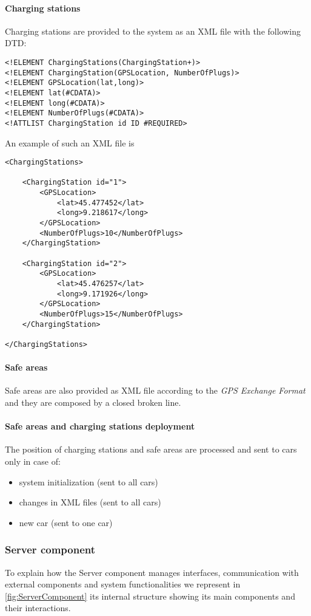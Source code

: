 \paragraph{Charging stations}Charging stations are provided to the system as an XML file with the following DTD:
\lstset{language=XML,frame=false}
\begin{lstlisting}
<!ELEMENT ChargingStations(ChargingStation+)>
<!ELEMENT ChargingStation(GPSLocation, NumberOfPlugs)>
<!ELEMENT GPSLocation(lat,long)>
<!ELEMENT lat(#CDATA)>
<!ELEMENT long(#CDATA)>
<!ELEMENT NumberOfPlugs(#CDATA)>
<!ATTLIST ChargingStation id ID #REQUIRED>
\end{lstlisting}
An example of such an XML file is 
\begin{lstlisting}
<ChargingStations>

	<ChargingStation id="1">
		<GPSLocation>
			<lat>45.477452</lat>
			<long>9.218617</long>
		</GPSLocation>
		<NumberOfPlugs>10</NumberOfPlugs>
	</ChargingStation>
	
	<ChargingStation id="2">
		<GPSLocation>
			<lat>45.476257</lat>
			<long>9.171926</long>
		</GPSLocation>
		<NumberOfPlugs>15</NumberOfPlugs>
	</ChargingStation>
	
</ChargingStations>
\end{lstlisting}

\paragraph{Safe areas}Safe areas are also provided as XML file according to the \emph{GPS Exchange Format} and they are composed by a closed broken line.

\paragraph{Safe areas and charging stations deployment}The position of charging stations and safe areas are processed and sent to cars only in case of:
\begin{itemize}
	\item system initialization (sent to all cars)
	\item changes in XML files (sent to all cars)
	\item new car (sent to one car)
\end{itemize}

\subsubsection{Server component}
To explain how the Server component manages interfaces, communication with external components and system functionalities we represent in \autoref{fig:ServerComponent} its internal structure showing its main components and their interactions.
\\

